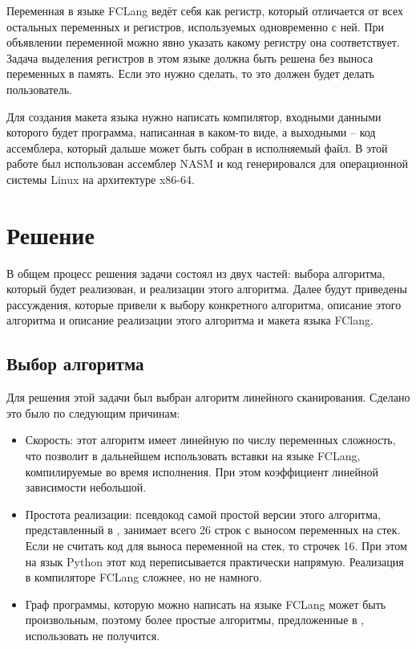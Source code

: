 \documentclass[a4paper,14pt]{extarticle}
\begin{document}
Переменная в языке FCLang ведёт себя как регистр, который отличается от всех остальных переменных и регистров, используемых одновременно с ней.
При объявлении переменной можно явно указать какому регистру она соответствует.
Задача выделения регистров в этом языке должна быть решена без выноса переменных в память.
Если это нужно сделать, то это должен будет делать пользователь.

Для создания макета языка нужно написать компилятор, входными данными которого будет программа, написанная в каком-то виде,
а выходными -- код ассемблера, который дальше может быть собран в исполняемый файл.
В этой работе был использован ассемблер NASM и код генерировался для операционной системы Linux на архитектуре x86-64.

\section{Решение}

В общем процесс решения задачи состоял из двух частей: выбора алгоритма, который будет реализован, и реализации этого алгоритма.
Далее будут приведены рассуждения, которые привели к выбору конкретного алгоритма, описание этого алгоритма и описание реализации этого алгоритма и макета языка FClang.

\subsection{Выбор алгоритма}

Для решения этой задачи был выбран алгоритм линейного сканирования.
Сделано это было по следующим причинам:
\begin{itemize}
    \item Скорость: этот алгоритм имеет линейную по числу переменных сложность, что позволит в дальнейшем использовать вставки на языке FCLang, компилируемые во время исполнения.
        При этом коэффициент линейной зависимости небольшой.
    \item Простота реализации: псевдокод самой простой версии этого алгоритма, представленный в \cite{poletto_linear_1999}, занимает всего 26 строк с выносом переменных на стек.
        Если не считать код для выноса переменной на стек, то строчек 16.
        При этом на язык Python этот код переписывается практически напрямую.
        Реализация в компиляторе FCLang сложнее, но не намного.
    \item Граф программы, которую можно написать на языке FCLang может быть произвольным, 
        поэтому более простые алгоритмы, предложенные в \cite{hutchison_register_2005}, использовать не получится.
\end{itemize}
\end{document}
